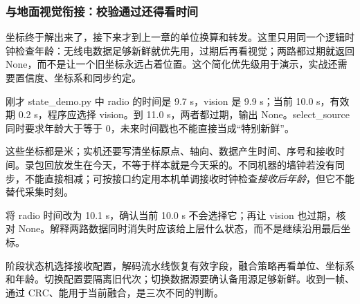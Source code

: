 \subsubsection{与地面视觉衔接：校验通过还得看时间}
坐标终于解出来了，接下来才到上一章的单位换算和转发。这里只用同一个逻辑时钟检查年龄：无线电数据足够新鲜就优先用，过期后再看视觉；两路都过期就返回 None，而不是让一个旧坐标永远占着位置。这个简化优先级用于演示，实战还需要置信度、坐标系和同步约定。
\begin{example}[让旧无线电坐标先退场]
刚才 state\_demo.py 中 radio 的时间是 9.7 s，vision 是 9.9 s；当前 10.0 s，有效期 0.2 s，程序应选择 vision。到 11.0 s，两者都过期，输出 None。select\_source 同时要求年龄大于等于 0，未来时间戳也不能直接当成“特别新鲜”。
\end{example}
\begin{note}
这些坐标都是米；实机还要写清坐标原点、轴向、数据产生时间、序号和接收时间。录包回放发生在今天，不等于样本就是今天采的。不同机器的墙钟若没有同步，不能直接相减；可按接口约定用本机单调接收时钟检查\emph{接收后年龄}，但它不能替代采集时刻。
\end{note}
\begin{exercise}\label{ex:v2-sdr-fresh}
将 radio 时间改为 10.1 s，确认当前 10.0 s 不会选择它；再让 vision 也过期，核对 None。解释两路数据同时消失时应该给上层什么状态，而不是继续沿用最后坐标。
\end{exercise}
\begin{conclusion}
阶段状态机选择接收配置，解码流水线恢复有效字段，融合策略再看单位、坐标系和年龄。切换配置要隔离旧代次；切换数据源要确认备用源足够新鲜。收到一帧、通过 CRC、能用于当前融合，是三次不同的判断。
\end{conclusion}

